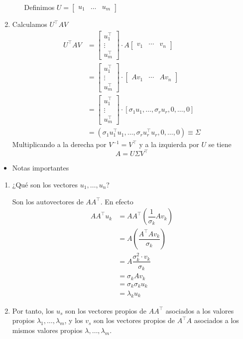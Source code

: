 \begin{enumerate}[label=\color{lightblue}\underline{Paso \arabic*:}]
\begin{enumerate}[label=\color{lightblue}2.\arabic*)]
		Definimos $U=\begin{bmatrix}
			u_1&\dots&u_m
		\end{bmatrix}$
	\end{enumerate}
	\item Calculamos $U^\intercal AV$\begin{align*}
		U^\intercal AV&=\begin{bmatrix}
			u_1^\intercal\\
			\vdots\\
			u_m^\intercal
		\end{bmatrix}\cdot A\begin{bmatrix}
			v_1 & \cdots & v_n
		\end{bmatrix}\\
		&=\begin{bmatrix}
			u_1^\intercal\\
			\vdots\\
			u_m^\intercal 
		\end{bmatrix}\cdot\begin{bmatrix}
			Av_1 & \cdots & Av_n
		\end{bmatrix}\\
		&=\begin{bmatrix}
			u_1^\intercal\\
			\vdots\\
			u_m^\intercal
		\end{bmatrix}\cdot[\sigma_1u_1,\dots,\sigma_ru_r,0,\dots,0]\\
		&=(\sigma_1u_1^\intercal u_1,\dots,\sigma_ru_r^\intercal u_r,0,\dots,0)\equiv\Sigma
	\end{align*}
	Multiplicando a la derecha por $V^{-1}=V^\intercal$ y a la izquierda por $U$ se tiene \[ A=U\Sigma V^\intercal \]
\end{enumerate}
\begin{itemize}[label=\color{red}\textbullet, leftmargin=*]
	\item \color{lightblue}Notas importantes
\end{itemize}
\begin{enumerate}[label=\color{lightblue}\arabic*)]
	\item ¿Qué son los vectores $u_1,\dots,u_n$?
	
	Son los autovectores de $AA^\intercal$. En efecto \begin{align*}
		AA^\intercal u_k&=AA^\intercal\left(\dfrac{1}{\sigma_k}Av_k\right)\\
		&=A\left(\dfrac{A^\intercal Av_k}{\sigma_k}\right)\\
		&=A\dfrac{\sigma_k^2\cdot v_k}{\sigma_k}\\
		&=\sigma_kAv_k\\
		&=\sigma_k\sigma_ku_k\\
		&=\lambda_ku_k
	\end{align*}
	\item Por tanto, los $u_s$ son los vectores propios de $AA^\intercal$ asociados a los valores propios $\lambda_1,\dots,\lambda_m$, y los $v_s$ son los vectores propios de $A^\intercal A$ asociados a los mismos valores propios $\lambda,\dots,\lambda_m$.
\end{enumerate}
